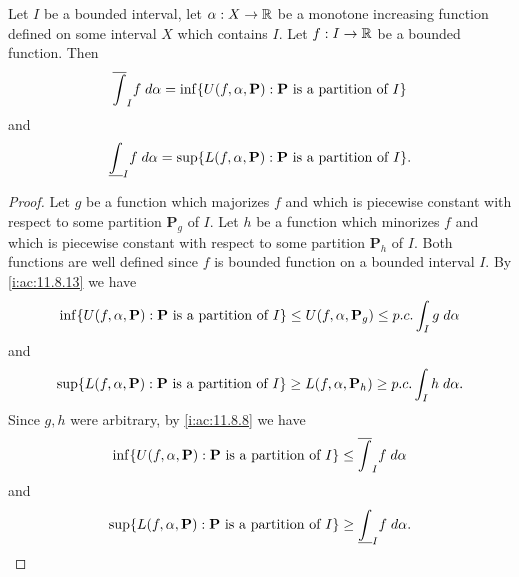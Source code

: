 \begin{ac}\label{i:ac:11.8.14}
  Let \(I\) be a bounded interval, let \(\alpha : X \to \mathbb{R}\) be a monotone increasing function defined on some interval \(X\) which contains \(I\).
  Let \(f : I \to \mathbb{R}\) be a bounded function.
  Then
  \[
    \overline{\int}_I f \; d \alpha = \inf\set{U(f, \alpha, \mathbf{P}) : \mathbf{P} \text{ is a partition of } I}
  \]
  and
  \[
    \underline{\int}_I f \; d \alpha = \sup\set{L(f, \alpha, \mathbf{P}) : \mathbf{P} \text{ is a partition of } I}.
  \]
\end{ac}

\begin{proof}
  Let \(g\) be a function which majorizes \(f\) and which is piecewise constant with respect to some partition \(\mathbf{P}_g\) of \(I\).
  Let \(h\) be a function which minorizes \(f\) and which is piecewise constant with respect to some partition \(\mathbf{P}_h\) of \(I\).
  Both functions are well defined since \(f\) is bounded function on a bounded interval \(I\).
  By \cref{i:ac:11.8.13} we have
  \[
    \inf\set{U(f, \alpha, \mathbf{P}) : \mathbf{P} \text{ is a partition of } I} \leq U(f, \alpha, \mathbf{P}_g) \leq p.c. \int_I g \; d \alpha
  \]
  and
  \[
    \sup\set{L(f, \alpha, \mathbf{P}) : \mathbf{P} \text{ is a partition of } I} \geq L(f, \alpha, \mathbf{P}_h) \geq p.c. \int_I h \; d \alpha.
  \]
  Since \(g, h\) were arbitrary, by \cref{i:ac:11.8.8} we have
  \[
    \inf\set{U(f, \alpha, \mathbf{P}) : \mathbf{P} \text{ is a partition of } I} \leq \overline{\int}_I f \; d \alpha
  \]
  and
  \[
    \sup\set{L(f, \alpha, \mathbf{P}) : \mathbf{P} \text{ is a partition of } I} \geq \underline{\int}_I f \; d \alpha.
  \]


\end{proof}
